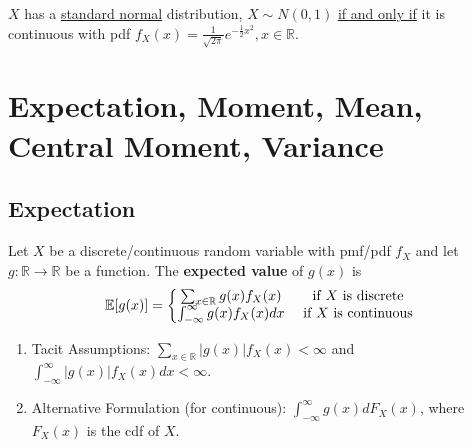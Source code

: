 \documentclass[11pt]{elegantbook}
\begin{document}
\begin{example}[ Normal]
    $X$ has a \underline{standard normal} distribution, $X\sim N(0,1)$ \underline{if and only if} it is continuous with pdf $f_X(x)=\frac{1}{\sqrt{2\pi}}e^{-\frac{1}{2}x^2}, x\in \mathbb{R}$.
\end{example}

\section{Expectation, Moment, Mean, Central Moment, Variance}

\subsection{Expectation}
\begin{definition}
    \normalfont
    Let $X$ be a discrete/continuous random variable with pmf/pdf $f_X$ and let $g: \mathbb{R} \rightarrow \mathbb{R}$ be a function. The \textbf{expected value} of $g(x)$ is $$\mathbb{E}[g(x)]=\left\{\begin{matrix}
        \sum_{x\in \mathbb{R}}g(x)f_X(x)&\textnormal{ if $X$ is discrete}\\
        \int_{-\infty}^\infty g(x) f_X(x) dx&\textnormal{ if $X$ is continuous}
    \end{matrix}\right.$$
\end{definition}
\begin{note}
    \begin{enumerate}[$\circ$]
        \item Tacit Assumptions: $\sum_{x\in \mathbb{R}}|g(x)|f_X(x)<\infty$ and $\int_{-\infty}^\infty |g(x)|f_X(x)dx<\infty$.
        \item Alternative Formulation (for continuous): $\int_{-\infty}^\infty g(x)dF_X(x)$, where $F_X(x)$ is the cdf of $X$.
    \end{enumerate}
\end{note}
\end{document}
